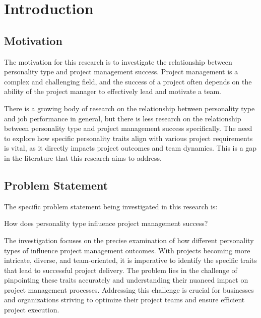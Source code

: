 
\section{Introduction}
\vspace{1\baselineskip}

\subsection{Motivation}

The motivation for this research is to investigate the relationship between personality type and project management success. Project management is a complex and challenging field, and the success of a project often depends on the ability of the project manager to effectively lead and motivate a team.

There is a growing body of research on the relationship between personality type and job performance in general, but there is less research on the relationship between personality type and project management success specifically. The need to explore how specific personality traits align with various project requirements is vital, as it directly impacts project outcomes and team dynamics. This is a gap in the literature that this research aims to address.

\subsection{Problem Statement}
The specific problem statement being investigated in this research is:

How does personality type influence project management success?

The investigation focuses on the precise examination of how different personality types of influence project management outcomes. With projects becoming more intricate, diverse, and team-oriented, it is imperative to identify the specific traits that lead to successful project delivery. The problem lies in the challenge of pinpointing these traits accurately and understanding their nuanced impact on project management processes. Addressing this challenge is crucial for businesses and organizations striving to optimize their project teams and ensure efficient project execution.

